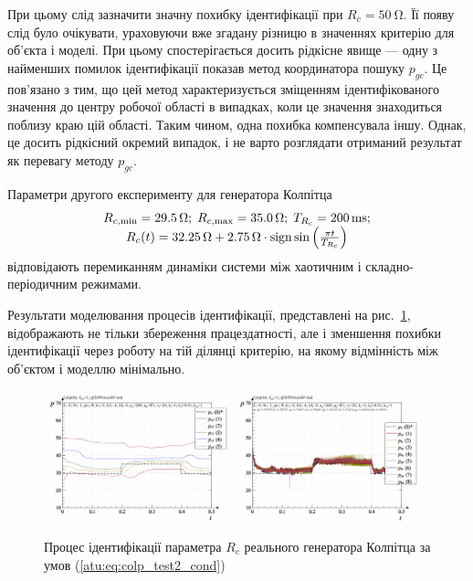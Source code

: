 При цьому слід зазначити значну похибку ідентифікації при
$ R_c = \SI{50}{\ohm} $. Її появу слід було очікувати, ураховуючи вже
згадану різницю в значеннях критерію для об'єкта і моделі. При
цьому спостерігається досить рідкісне явище --- одну з найменших
помилок ідентифікації показав метод координатора пошуку
$ p_{gc} $. Це пов'язано з тим, що цей метод характеризується
зміщенням ідентифікованого значення до центру робочої області в
випадках, коли це значення знаходиться
поблизу краю цій області. Таким чином, одна похибка компенсувала
іншу. Однак, це досить рідкісний окремий випадок, і не варто
розглядати отриманий результат як перевагу методу
$p_{gc}$.


Параметри другого експерименту для генератора Колпітца
%
\begin{equation}
  \begin{array}{c}
    R_{c,\min} = \SI{29.5}{\ohm};
    \;
    R_{c,\max} = \SI{35.0}{\ohm};
    \;
    T_{R_c} = \SI{200}{\milli\second};
  \\
    R_c(t) = \SI{32.25}{\ohm} + \SI{2.75}{\ohm} \cdot \operatorname*{sign} \sin \left( \frac{\pi t}{T_{R_c}}  \right)
  \end{array}
  \label{atu:eq:colp_test2_cond}
\end{equation}
%
відповідають перемиканням динаміки системи між хаотичним і
складно-періодичним режимами.

Результати моделювання процесів ідентифікації, представлені
на рис.~\ref{atu:f:colp_r_id_2}, відображають не тільки збереження
працездатності, але і зменшення похибки ідентифікації через
роботу на тій ділянці критерію, на якому відмінність між об'єктом
і моделлю мінімально.

\begin{figure}[htb!]
  \centerline{
    \includegraphics[width=0.48\textwidth]{p/r/colp_real_id-p_t_pi_ql3rlWvnAAW_real_d_1.png}
    \hfill
    \includegraphics[width=0.48\textwidth]{p/r/colp_real_id-p_t_p_ql3rlWvnAAW_real_d_1.png}
  }
\caption{Процес ідентифікації параметра $ R_c $ реального генератора Колпітца за умов (\ref{atu:eq:colp_test2_cond})}
\label{atu:f:colp_r_id_2}
\end{figure}


